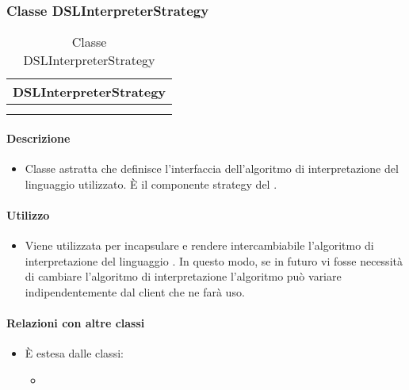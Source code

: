 \subsubsection{Classe DSLInterpreterStrategy}

\begin{table}[ht]
\begin{center}
\bgroup
\setlength{\arrayrulewidth}{0.6mm}
\def\arraystretch{1}
\begin{tabular}{ | p{12cm} | }
\hline
\centerline{\textbf{DSLInterpreterStrategy}}
\\ \hline
 \\ 
\hline
 \\ 
\hline
\end{tabular}
\egroup
\caption{Classe DSLInterpreterStrategy}
\end{center}
\end{table}

\paragraph*{Descrizione}
\begin{itemize}
\item[] Classe astratta che definisce l'interfaccia dell'algoritmo di interpretazione del linguaggio  utilizzato. È il componente strategy del  .
\end{itemize}

\paragraph*{Utilizzo}
\begin{itemize}
\item[] Viene utilizzata per incapsulare e rendere intercambiabile l'algoritmo di interpretazione del linguaggio . In questo modo, se in futuro vi fosse necessità di cambiare l'algoritmo di interpretazione l'algoritmo può variare indipendentemente dal client che ne farà uso.
\end{itemize}

\paragraph*{Relazioni con altre classi}
\begin{itemize}

\item[] È estesa dalle classi:
\begin{itemize}
\item {}
\end{itemize}

\end{itemize}

